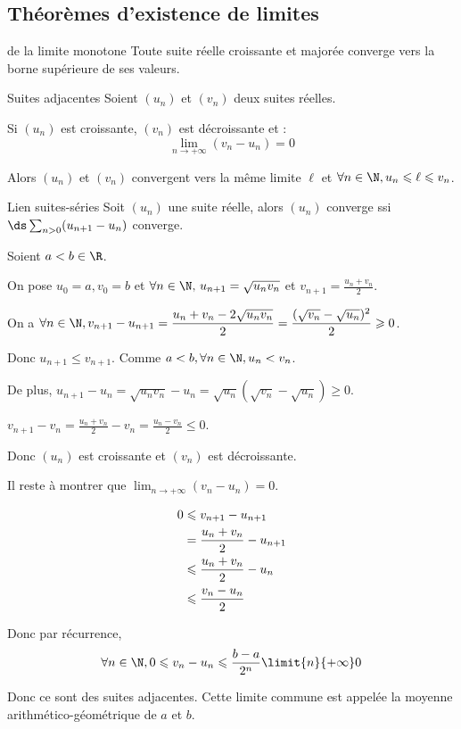 \subsection{Théorèmes d'existence de limites}

\begin{theoreme}{de la limite monotone}{}
    Toute suite réelle croissante et majorée converge vers la borne supérieure de ses valeurs. 
\end{theoreme}

\begin{theoreme}{Suites adjacentes}{}
    Soient $(u_n)$ et $(v_n)$ deux suites réelles. 

    Si $(u_n)$ est croissante, $(v_n)$ est décroissante et :
    \[\lim_{n \to +\infty} (v_n - u_n) = 0\]

    Alors $(u_n)$ et $(v_n)$ convergent vers la même limite $\ell$ 
    et $\forall n \in \N, u_n \leqslant \ell \leqslant v_n$.
\end{theoreme}

\begin{theoreme}{Lien suites-séries}{}
    Soit $(u_n)$ une suite réelle, alors $(u_n)$ converge ssi $\ds \sum_{n>0} (u_{n+1} - u_n)$ converge.
\end{theoreme}

\begin{exemple}
    Soient $a < b \in \R$.

    On pose $u_0 = a, v_0 = b$ 
    et $\forall n \in \N, \, u_{n+1} = \sqrt{u_n v_n}$ et $v_{n+1} = \frac{u_n + v_n} 2$.
 
    \svspace On a $\displaystyle \forall n \in \N, v_{n+1} - u_{n+1} = \frac{u_n + v_n -2 \sqrt{u_n v_n}} 2 = \frac{(\sqrt{v_n} - \sqrt{u_n})^2} 2 \geqslant 0$.

    Donc $u_{n + 1} \leqslant v_{n + 1}$.
    Comme $a < b, \forall n \in \N, u_n < v_n$.

    \avspace De plus, $u_{n + 1} - u_n = \sqrt{u_n v_n} - u_n = \sqrt{u_n}\left(\sqrt{v_n} - \sqrt{u_n}\right) \geqslant 0$.

    $v_{n + 1} - v_n = \frac{u_n + v_n} 2 - v_n = \frac{u_n - v_n} 2 \leqslant 0$.

    Donc $(u_n)$ est croissante et $(v_n)$ est décroissante.

    Il reste à montrer que $\lim_{n \to +\infty} (v_n - u_n) = 0$.

    \begin{align*}
        0 & \leqslant  v_{n + 1} - u_{n + 1} \\
        \space & = \frac{u_n + v_n} 2 - u_{n + 1} \\
        \space &  \leqslant \frac{u_n + v_n} 2 - u_n \\
        \space & \leqslant \frac{v_n - u_n} 2 \\
    \end{align*}
    
    Donc par récurrence, 
    \[\forall n \in \N, 0 \leqslant v_n - u_n \leqslant \frac{b - a}{2^n} \limit{n}{+ \infty} 0\]

    Donc ce sont des suites adjacentes.
    Cette limite commune est appelée la moyenne arithmético-géométrique de $a$ et $b$.
\end{exemple}

